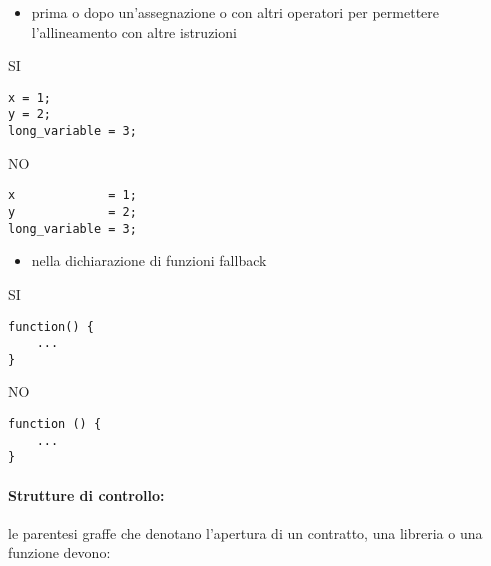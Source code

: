 \documentclass[../ProcessiPrimari.tex]{subfiles}
\begin{document}
\begin{itemize}
\item prima o dopo un'assegnazione o con altri operatori per permettere l'allineamento con altre istruzioni 
\end{itemize}
\begin{center}{
\begin{minipage}{5cm}
{\begin{center}SI\end{center}}
\begin{Verbatim}[frame=single]
x = 1;
y = 2;
long_variable = 3;
\end{Verbatim}
\end{minipage}
\hfil
\begin{minipage}{5cm}
{\begin{center}NO\end{center}}
\begin{Verbatim}[frame=single]
x             = 1;
y             = 2;
long_variable = 3;
\end{Verbatim}
\end{minipage}
}
\end{center}

\begin{itemize}
\item nella dichiarazione di funzioni fallback
\end{itemize}
\begin{center}{
\begin{minipage}{5cm}
{\begin{center}SI\end{center}}
\begin{Verbatim}[frame=single]
function() {
    ...
}
\end{Verbatim}
\end{minipage}
\hfil
\begin{minipage}{5cm}
{\begin{center}NO\end{center}}
\begin{Verbatim}[frame=single]
function () {
    ...
}
\end{Verbatim}
\end{minipage}
}
\end{center}

\paragraph*{Strutture di controllo: }
le parentesi graffe che denotano l'apertura di un contratto, una libreria o una funzione devono:
\end{document}
